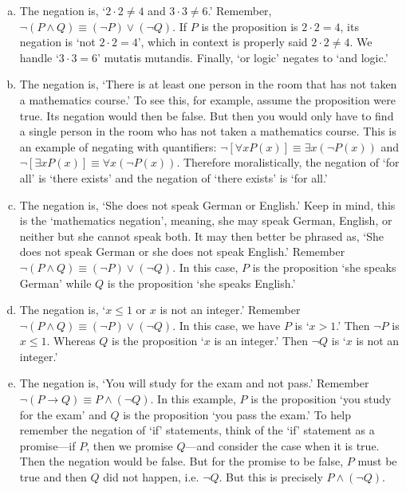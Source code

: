 \documentclass[11pt,letterpaper]{article}
\begin{document}
\sol
\begin{enumerate}[(a)]
\item The negation is, `$2 \cdot 2\neq 4$ and $3 \cdot 3\neq 6$.' Remember, $\neg (P \wedge Q) \equiv (\neg P) \vee (\neg Q)$. If $P$ is the proposition is $2 \cdot 2= 4$, its negation is `not $2 \cdot 2= 4$', which in context is properly said $2 \cdot 2 \neq 4$. We handle `$3 \cdot 3= 6$' mutatis mutandis. Finally, `or logic' negates to `and logic.' 

\item The negation is, `There is at least one person in the room that has not taken a mathematics course.' To see this, for example, assume the proposition were true. Its negation would then be false. But then you would only have to find a single person in the room who has not taken a mathematics course. This is an example of negating with quantifiers: $\neg [\forall x P(x)] \equiv \exists x (\neg P(x))$ and $\neg [\exists x P(x)] \equiv \forall x (\neg P(x))$. Therefore moralistically, the negation of `for all' is `there exists' and the negation of `there exists' is `for all.'   

\item The negation is, `She does not speak German or English.' Keep in mind, this is the `mathematics negation', meaning, she may speak German, English, or neither but she cannot speak both. It may then better be phrased as, `She does not speak German or she does not speak English.' Remember $\neg (P \wedge Q) \equiv (\neg P) \vee (\neg Q)$. In this case, $P$ is the proposition `she speaks German' while $Q$ is the proposition `she speaks English.' 

\item The negation is, `$x \leq 1$ or $x$ is not an integer.' Remember $\neg (P \wedge Q) \equiv (\neg P) \vee (\neg Q)$. In this case, we have $P$ is `$x > 1$.' Then $\neg P$ is $x \leq 1$. Whereas $Q$ is the proposition `$x$ is an integer.' Then $\neg Q$ is `$x$ is not an integer.' 

\item The negation is, `You will study for the exam and not pass.' Remember $\neg (P \to Q) \equiv P \wedge (\neg Q)$. In this example, $P$ is the proposition `you study for the exam' and $Q$ is the proposition `you pass the exam.' To help remember the negation of `if' statements, think of the `if' statement as a promise---if $P$, then we promise $Q$---and consider the case when it is true. Then the negation would be false. But for the promise to be false, $P$ must be true and then $Q$ did not happen, i.e. $\neg Q$. But this is precisely $P \wedge (\neg Q)$. 
\end{enumerate}
\end{document}
